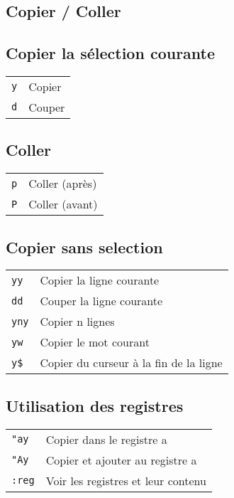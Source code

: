 \documentclass[8pt,landscape,a4paper]{article}
\begin{document}
\begin{multicols*}{3}
    \section{Copier / Coller}
    \subsection{ Copier la sélection courante }
    \begin{tabular}{m{2cm} l}
        \texttt{y}& Copier\\
        \texttt{d}& Couper\\
    \end{tabular}
    \subsection{ Coller }
    \begin{tabular}{m{2cm} l}
        \texttt{p}& Coller (après)\\
        \texttt{P}& Coller (avant)\\
    \end{tabular}
    \subsection{ Copier sans selection }
    \begin{tabular}{m{2cm} l}
        \texttt{yy}& Copier la ligne courante\\
        \texttt{dd}& Couper la ligne courante\\
        \texttt{yny}& Copier n lignes \\
        \texttt{yw}& Copier le mot courant\\
        \texttt{y\$}& Copier du curseur à la fin de la ligne\\
    \end{tabular}

    \subsection{ Utilisation des registres }
    \begin{tabular}{m{2cm} l}
        \texttt{"ay}& Copier dans le registre a\\
        \texttt{"Ay}& Copier et ajouter au registre a\\
        \texttt{:reg}& Voir les registres et leur contenu\\
    \end{tabular} \\


\end{multicols*}
\end{document}

